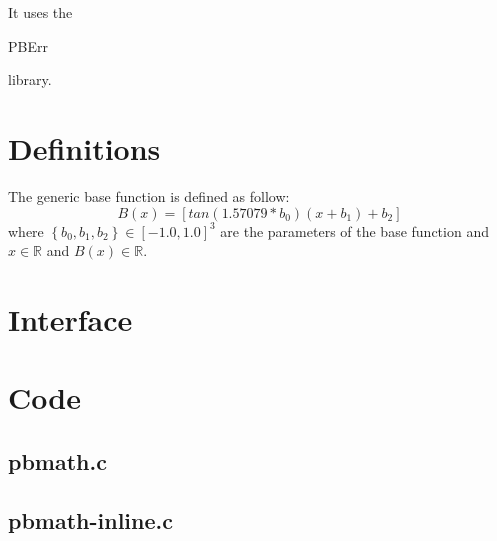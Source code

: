 It uses the \begin{ttfamily}PBErr\end{ttfamily} library.\\

\section{Definitions}

The generic base function is defined as follow:\\
\begin{equation}
B(x)=\left[tan(1.57079*b_0)(x+b_1)+b_2\right]
\end{equation}
where $\left\lbrace b_0,b_1,b_2\right\rbrace\in[-1.0,1.0]^3$ are the parameters of the base function and $x\in\mathbb{R}$ and $B(x)\in\mathbb{R}$.

\section{Interface}

\begin{scriptsize}
\begin{ttfamily}

\end{ttfamily}
\end{scriptsize}

\section{Code}

\subsection{pbmath.c}

\begin{scriptsize}
\begin{ttfamily}

\end{ttfamily}
\end{scriptsize}

\subsection{pbmath-inline.c}

\begin{scriptsize}
\begin{ttfamily}

\end{ttfamily}
\end{scriptsize}

